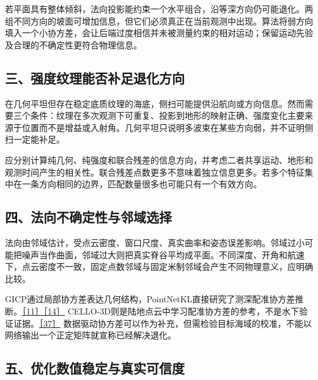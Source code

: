 若平面具有整体倾斜，法向投影能约束一个水平组合，沿等深方向仍可能退化。两组不同方向的坡面可增加信息，但它们必须真正在当前观测中出现。算法将弱方向填入一个小协方差，会让后端过度相信并未被测量约束的相对运动；保留运动先验及合理的不确定性更符合物理信息。

\hypertarget{ux4e09ux5f3aux5ea6ux7eb9ux7406ux80fdux5426ux8865ux8db3ux9000ux5316ux65b9ux5411}{%
\subsection{三、强度纹理能否补足退化方向}\label{ux4e09ux5f3aux5ea6ux7eb9ux7406ux80fdux5426ux8865ux8db3ux9000ux5316ux65b9ux5411}}

在几何平坦但存在稳定底质纹理的海底，侧扫可能提供沿航向或方向信息。然而需要三个条件：纹理在多次观测下可重复、投影到地形的映射正确、强度变化主要来源于位置而不是增益或入射角。几何平坦只说明多波束在某些方向弱，并不证明侧扫一定能补足。

应分别计算纯几何、纯强度和联合残差的信息方向，并考虑二者共享运动、地形和观测时间产生的相关性。联合残差点数更多不意味着独立信息更多。若多个特征集中在一条方向相同的边界，匹配数量很多也可能只有一个有效方向。

\hypertarget{ux56dbux6cd5ux5411ux4e0dux786eux5b9aux6027ux4e0eux90bbux57dfux9009ux62e9}{%
\subsection{四、法向不确定性与邻域选择}\label{ux56dbux6cd5ux5411ux4e0dux786eux5b9aux6027ux4e0eux90bbux57dfux9009ux62e9}}

法向由邻域估计，受点云密度、窗口尺度、真实曲率和姿态误差影响。邻域过小可能把噪声当作曲面，邻域过大则把真实脊谷平均成平面。不同深度、开角和航速下，点云密度不一致，固定点数邻域与固定米制邻域会产生不同物理意义，应明确比较。

GICP通过局部协方差表达几何结构，PointNetKL直接研究了测深配准协方差推断。\href{https://www.robots.ox.ac.uk/~avsegal/resources/papers/Generalized_ICP.pdf}{［11］}\href{https://arxiv.org/abs/2003.10931}{［14］} CELLO-3D则是陆地点云中学习配准协方差的参考，不是水下验证证据。\href{https://arxiv.org/abs/1810.01470}{［37］} 数据驱动协方差可以作为补充，但需检验目标海域的校准，不能以网络输出一个正定矩阵就宣称已经解决退化。

\hypertarget{ux4e94ux4f18ux5316ux6570ux503cux7a33ux5b9aux4e0eux771fux5b9eux53efux4fe1ux5ea6}{%
\subsection{五、优化数值稳定与真实可信度}\label{ux4e94ux4f18ux5316ux6570ux503cux7a33ux5b9aux4e0eux771fux5b9eux53efux4fe1ux5ea6}}

